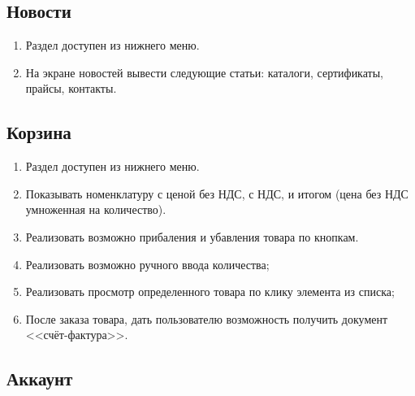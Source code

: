 \subsection{Новости}

\begin{enumerate}[label=\thesubsection.\arabic*, leftmargin=3cm]
    \item Раздел доступен из нижнего меню.
    \item На экране новостей вывести следующие статьи: каталоги, сертификаты, прайсы, контакты.
\end{enumerate}

\subsection{Корзина}

\begin{enumerate}[label=\thesubsection.\arabic*, leftmargin=3cm]
    \item Раздел доступен из нижнего меню.
    \item Показывать номенклатуру с ценой без НДС, с НДС, и итогом (цена без НДС умноженная на количество).
    \item Реализовать возможно прибаления и убавления товара по кнопкам.
    \item Реализовать возможно ручного ввода количества;
    \item Реализовать просмотр определенного товара по клику элемента из списка;
    \item После заказа товара, дать пользователю возможность получить документ <<счёт-фактура>>.
\end{enumerate}



\subsection{Аккаунт}

